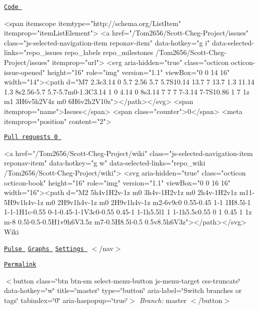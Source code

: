   \href{/Tom2656/Scott-Cheg-Project}{\tt Code  }  \begin{DoxyVerb}<span itemscope itemtype="http://schema.org/ListItem" itemprop="itemListElement">
  <a href="/Tom2656/Scott-Cheg-Project/issues" class="js-selected-navigation-item reponav-item" data-hotkey="g i" data-selected-links="repo_issues repo_labels repo_milestones /Tom2656/Scott-Cheg-Project/issues" itemprop="url">
    <svg aria-hidden="true" class="octicon octicon-issue-opened" height="16" role="img" version="1.1" viewBox="0 0 14 16" width="14"><path d="M7 2.3c3.14 0 5.7 2.56 5.7 5.7S10.14 13.7 7 13.7 1.3 11.14 1.3 8s2.56-5.7 5.7-5.7m0-1.3C3.14 1 0 4.14 0 8s3.14 7 7 7 7-3.14 7-7S10.86 1 7 1z m1 3H6v5h2V4z m0 6H6v2h2V10z"></path></svg>
    <span itemprop="name">Issues</span>
    <span class="counter">0</span>
    <meta itemprop="position" content="2">
\end{DoxyVerb}
  

  \href{/Tom2656/Scott-Cheg-Project/pulls}{\tt Pull requests 0  }  \begin{DoxyVerb}<a href="/Tom2656/Scott-Cheg-Project/wiki" class="js-selected-navigation-item reponav-item" data-hotkey="g w" data-selected-links="repo_wiki /Tom2656/Scott-Cheg-Project/wiki">
  <svg aria-hidden="true" class="octicon octicon-book" height="16" role="img" version="1.1" viewBox="0 0 16 16" width="16"><path d="M2 5h4v1H2v-1z m0 3h4v-1H2v1z m0 2h4v-1H2v1z m11-5H9v1h4v-1z m0 2H9v1h4v-1z m0 2H9v1h4v-1z m2-6v9c0 0.55-0.45 1-1 1H8.5l-1 1-1-1H1c-0.55 0-1-0.45-1-1V3c0-0.55 0.45-1 1-1h5.5l1 1 1-1h5.5c0.55 0 1 0.45 1 1z m-8 0.5l-0.5-0.5H1v9h6V3.5z m7-0.5H8.5l-0.5 0.5v8.5h6V3z"></path></svg>
  Wiki
\end{DoxyVerb}
  \href{/Tom2656/Scott-Cheg-Project/pulse}{\tt Pulse } \href{/Tom2656/Scott-Cheg-Project/graphs}{\tt Graphs } \href{/Tom2656/Scott-Cheg-Project/settings}{\tt Settings } $<$/nav$>$

  

 

\href{/Tom2656/Scott-Cheg-Project/blob/749fda8df241f5821058b28847b156a6dd98b44b/README.md}{\tt Permalink}



 $<$button class=\char`\"{}btn btn-\/sm select-\/menu-\/button js-\/menu-\/target css-\/truncate\char`\"{} data-\/hotkey=\char`\"{}w\char`\"{} title=\char`\"{}master\char`\"{} type=\char`\"{}button\char`\"{} aria-\/label=\char`\"{}\+Switch branches or tags\char`\"{} tabindex=\char`\"{}0\char`\"{} aria-\/haspopup=\char`\"{}true\char`\"{}$>$ {\itshape Branch\+:} master $<$/button$>$

